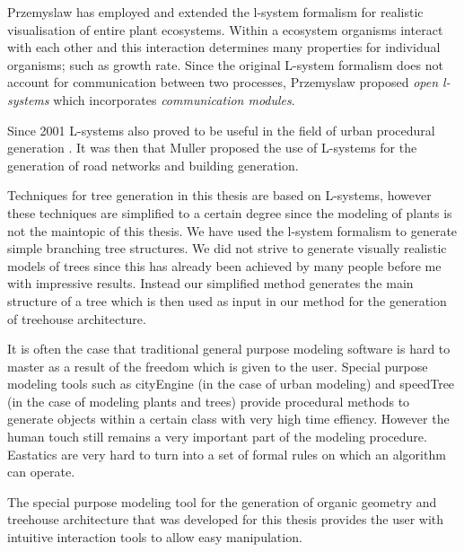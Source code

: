 Przemyslaw \citep{PrzemyslawPlants} has employed and extended the l-system formalism for realistic visualisation of entire plant ecosystems. Within a ecosystem organisms interact with each other and this interaction determines many properties for individual organisms; such as growth rate. Since the original L-system formalism does not account for communication between two processes, Przemyslaw proposed \emph{open l-systems} which incorporates \emph{communication modules}.    
  
Since 2001 L-systems also proved to be useful in the field of urban procedural generation \citep{Wonka03}. It was then that Muller proposed the use of L-systems for the generation of road networks and building generation. 


Techniques for tree generation in this thesis are based on L-systems, however these techniques are simplified to a certain degree since the modeling of plants is not the maintopic of this thesis. We have used the l-system formalism to generate simple branching tree structures. We did not strive to generate visually realistic models of trees since this has already been achieved by many people before me with impressive results. Instead our simplified method generates the main structure of a tree which is then used as input in our method for the generation of treehouse architecture. 


It is often the case that traditional general purpose modeling software is hard to master as a result of the freedom which is given to the user. Special purpose modeling tools such as cityEngine \citep{Muller06} (in the case of urban modeling) and speedTree (in the case of modeling plants and trees) provide procedural methods to generate objects within a certain class with very high time effiency. However the human touch still remains a very important part of the modeling procedure. Eastatics are very hard to turn into a set of formal rules on which an algorithm can operate.

The special purpose modeling tool for the generation of organic geometry and treehouse architecture that was developed for this thesis provides the user with intuitive interaction tools to allow easy manipulation.        




